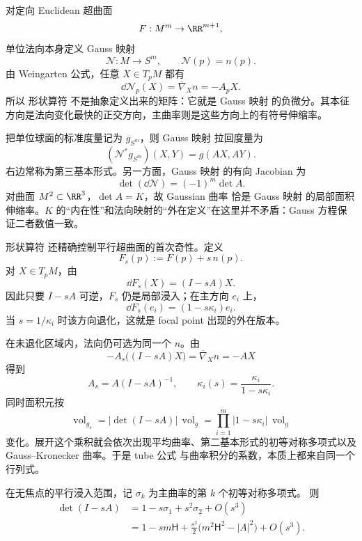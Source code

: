 对定向 Euclidean 超曲面
\[
F:M^m\to\RR^{m+1},
\]
单位法向本身定义 Gauss 映射
\begin{equation*}\mathcal N:M\longrightarrow S^m,
\qquad
\mathcal N(p)=n(p).\end{equation*}
由 Weingarten 公式，任意 $X\in T_pM$ 都有
\begin{equation}
\boxed{
\dd\mathcal N_p(X)
=\overline\nabla_Xn
=-A_pX.
}
\label{eq:math-dg-gauss-map-differential}
\end{equation}
所以 形状算符 不是抽象定义出来的矩阵：它就是 Gauss 映射 的负微分。其本征方向是法向变化最快的正交方向，主曲率则是这些方向上的有符号伸缩率。

把单位球面的标准度量记为 $g_{S^m}$，则 Gauss 映射 拉回度量为
\begin{equation*}(\mathcal N^*g_{S^m})(X,Y)
=g(AX,AY).\end{equation*}
右边常称为第三基本形式。另一方面，Gauss 映射 的有向 Jacobian 为
\begin{equation*}\det(\dd\mathcal N)
=(-1)^m\det A.\end{equation*}
对曲面 $M^2\subset\RR^3$，$\det A=K$，故 Gaussian 曲率 恰是 Gauss 映射 的局部面积伸缩率。$K$ 的“内在性”和法向映射的“外在定义”在这里并不矛盾：Gauss 方程保证二者数值一致。

形状算符 还精确控制平行超曲面的首次奇性。定义
\[
F_s(p):=F(p)+s\,n(p).
\]
对 $X\in T_pM$，由
\begin{equation*}\dd F_s(X)
=(I-sA)X.\end{equation*}
因此只要 $I-sA$ 可逆，$F_s$ 仍是局部浸入；在主方向 $e_i$ 上，
\[
\dd F_s(e_i)=(1-s\kappa_i)e_i.
\]
当 $s=1/\kappa_i$ 时该方向退化，这就是 focal point 出现的外在版本。

在未退化区域内，法向仍可选为同一个 $n$。由
\[
-A_s\bigl((I-sA)X\bigr)
=\overline\nabla_Xn
=-AX
\]
得到
\begin{equation*}\boxed{
A_s=A(I-sA)^{-1},
\qquad
\kappa_i(s)=\frac{\kappa_i}{1-s\kappa_i}.
}\end{equation*}
同时面积元按
\begin{equation}
\operatorname{vol}_{g_s}
=|\det(I-sA)|\,\operatorname{vol}_g
=\prod_{i=1}^m|1-s\kappa_i|\,\operatorname{vol}_g
\label{eq:math-dg-parallel-area-jacobian}
\end{equation}
变化。展开这个乘积就会依次出现平均曲率、第二基本形式的初等对称多项式以及 Gauss--Kronecker 曲率。于是 tube 公式 与曲率积分的系数，本质上都来自同一个 行列式。

\begin{proposition}[平行浸入的二阶面积响应]
在无焦点的平行浸入范围，记 $\sigma_k$ 为主曲率的第 $k$ 个初等对称多项式。
则
\[
\begin{aligned}
\det(I-sA)
&=1-s\sigma_1+s^2\sigma_2+O(s^3)\\
&=1-sm\mathsf H+\frac{s^2}{2}
\bigl(m^2\mathsf H^2-|A|^2\bigr)+O(s^3).
\end{aligned}
\]
\end{proposition}


